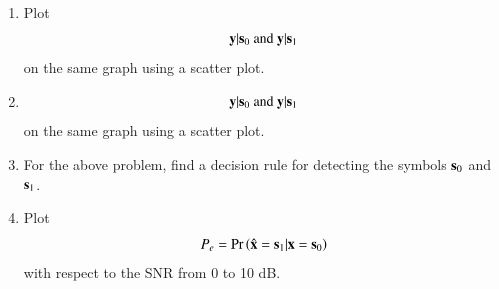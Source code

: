 \documentclass[journal,12pt,twocolumn]{IEEEtran}
\renewcommand\thesection{\arabic{section}}
\begin{document}
\begin{enumerate}[label=\thesection.\arabic*
,ref=\thesection.\theenumi]

\item
	\label{ch5_fsk}
	Plot 
	\begin{equation}
	\mathbf{y}|\mathbf{s}_0 \text{ and } \mathbf{y}|\mathbf{s}_1
	\end{equation}
	on the same graph using a scatter plot.
	
\item
	\begin{equation}
	\mathbf{y}|\mathbf{s}_0 \text{ and } \mathbf{y}|\mathbf{s}_1
	\end{equation}
	on the same graph using a scatter plot.
	
\item
	For the above problem, find a decision rule for detecting the symbols $\mathbf{s}_0 $ and $\mathbf{s}_1$.
	
\item
	Plot 
	\begin{equation} 
	P_e = \Pr\left(\hat{\mathbf{x}} = \mathbf{s}_1|\mathbf{x} = \mathbf{s}_0\right)
	\end{equation}
	with respect to the SNR from 0 to 10 dB.
\end{enumerate}
\end{document}
